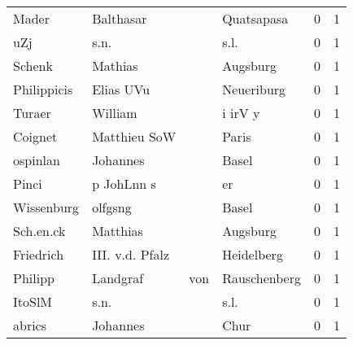 \begin{center}
\begin{tiny}
\begin{longtabu}{llllrr}
                    Mader &                          Balthasar &             &                                  Quatsapasa &          0 &         1 \\
                      uZj &                               s.n. &             &                                        s.l. &          0 &         1 \\
                   Schenk &                            Mathias &             &                                    Augsburg &          0 &         1 \\
              Philippicis &                          Elias UVu &             &                                  Neueriburg &          0 &         1 \\
                   Turaer &                            William &             &                                     i irV y &          0 &         1 \\
                  Coignet &                       Matthieu SoW &             &                                       Paris &          0 &         1 \\
                 ospinlan &                           Johannes &             &                                       Basel &          0 &         1 \\
                    Pinci &                         p JohLnn s &             &                                          er &          0 &         1 \\
               Wissenburg &                            olfgsng &             &                                       Basel &          0 &         1 \\
                Sch.en.ck &                           Matthias &             &                                    Augsburg &          0 &         1 \\
                Friedrich &                    III. v.d. Pfalz &             &                                  Heidelberg &          0 &         1 \\
                  Philipp &                           Landgraf &         von &                                Rauschenberg &          0 &         1 \\
                   ItoSlM &                               s.n. &             &                                        s.l. &          0 &         1 \\
                   abrics &                           Johannes &             &                                        Chur &          0 &         1 \\

\end{longtabu}
\end{tiny}
\end{center}
